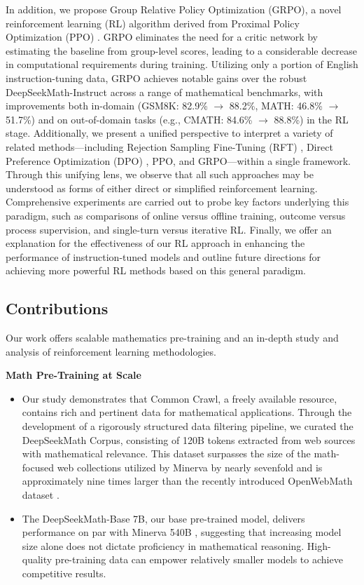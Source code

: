 In addition, we propose Group Relative Policy Optimization (GRPO), a novel reinforcement learning (RL) algorithm derived from Proximal Policy Optimization (PPO) \citep{schulman2017proximal}. GRPO eliminates the need for a critic network by estimating the baseline from group-level scores, leading to a considerable decrease in computational requirements during training. Utilizing only a portion of English instruction-tuning data, GRPO achieves notable gains over the robust DeepSeekMath-Instruct across a range of mathematical benchmarks, with improvements both in-domain (GSM8K: 82.9\% $\rightarrow$ 88.2\%, MATH: 46.8\% $\rightarrow$ 51.7\%) and on out-of-domain tasks (e.g., CMATH: 84.6\% $\rightarrow$ 88.8\%) in the RL stage. Additionally, we present a unified perspective to interpret a variety of related methods—including Rejection Sampling Fine-Tuning (RFT) \citep{yuan2023scaling}, Direct Preference Optimization (DPO) \citep{dpo}, PPO, and GRPO—within a single framework. Through this unifying lens, we observe that all such approaches may be understood as forms of either direct or simplified reinforcement learning. Comprehensive experiments are carried out to probe key factors underlying this paradigm, such as comparisons of online versus offline training, outcome versus process supervision, and single-turn versus iterative RL. Finally, we offer an explanation for the effectiveness of our RL approach in enhancing the performance of instruction-tuned models and outline future directions for achieving more powerful RL methods based on this general paradigm.

\subsection{Contributions}
Our work offers scalable mathematics pre-training and an in-depth study and analysis of reinforcement learning methodologies.

\textbf{Math Pre-Training at Scale}

\begin{itemize}[topsep=0pt]
    \item Our study demonstrates that Common Crawl, a freely available resource, contains rich and pertinent data for mathematical applications. Through the development of a rigorously structured data filtering pipeline, we curated the DeepSeekMath Corpus, consisting of 120B tokens extracted from web sources with mathematical relevance. This dataset surpasses the size of the math-focused web collections utilized by Minerva \citep{minerva} by nearly sevenfold and is approximately nine times larger than the recently introduced OpenWebMath dataset \citep{openwebmath}.

    \item The DeepSeekMath-Base 7B, our base pre-trained model, delivers performance on par with Minerva 540B \citep{minerva}, suggesting that increasing model size alone does not dictate proficiency in mathematical reasoning. High-quality pre-training data can empower relatively smaller models to achieve competitive results.
\end{itemize}

